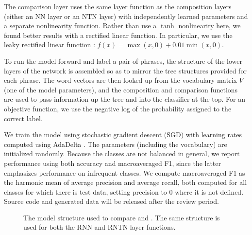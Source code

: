The comparison layer uses the same layer function as the
composition layers (either an NN layer or an NTN layer) with
independently learned parameters and a separate nonlinearity function.
Rather than use a $\tanh$ nonlinearity here, we found better results with a rectified linear function. In
particular, we use the leaky rectified linear function
\cite{maasrectifier}: $f(x)=\max(x, 0) +
0.01\min(x, 0)$.

To run the model forward and label a pair of phrases, the structure of
the lower layers of the network is assembled so as to mirror the tree
structures provided for each phrase. The word vectors are then looked
up from the vocabulary matrix $V$ (one of the model parameters), and
the composition and comparison functions are used to pass information
up the tree and into the classifier at the top. For an objective
function, we use the negative log of the probability assigned to the
correct label.

We train the model using stochastic gradient descent (SGD)
with learning rates computed using AdaDelta \cite{zeiler2012adadelta}.
The parameters (including the vocabulary) are initialized randomly.
Because the classes are not balanced in general, we report performance
using both accuracy and macroaveraged F1, since the latter emphasizes
 performance on infrequent classes. We compute macroaveraged F1 
as the harmonic mean of average precision and average recall, both computed
for all classes for which there is test data, setting precision to 0 
where it is not defined. Source code and generated data will be released
after the review period.

\begin{figure}[tp]
  \centering
  
  \caption{The model structure used to compare  and . 
    The same structure is used for both the RNN and RNTN layer functions.} 
  \label{sample-figure}
\end{figure}
